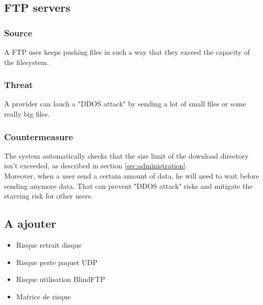 \documentclass[a4paper,11pt]{article}
\begin{document}
\subsection{FTP servers}


\subsubsection{Source}
A FTP user keeps pushing files in such a way that they exceed the capacity of the filesystem.

\subsubsection{Threat}
A provider can lauch a "DDOS attack" by sending a lot of small files or some really big files.
\subsubsection{Countermeasure}
The system automatically checks that the size limit of the download directory isn't exceeded, as described in section  \ref{sec:administration}.\\

Moreover, when a user send a certain amount of data, he will need to wait before sending anymore data. That can prevent "DDOS attack" risks and mitigate the starving risk for other users.
\subsection{A ajouter}
\begin{itemize}
\item Risque retrait disque
\item Risque perte paquet UDP
\item Risque utilisation BlindFTP
\item Matrice de risque 
\end{itemize}
\end{document}
